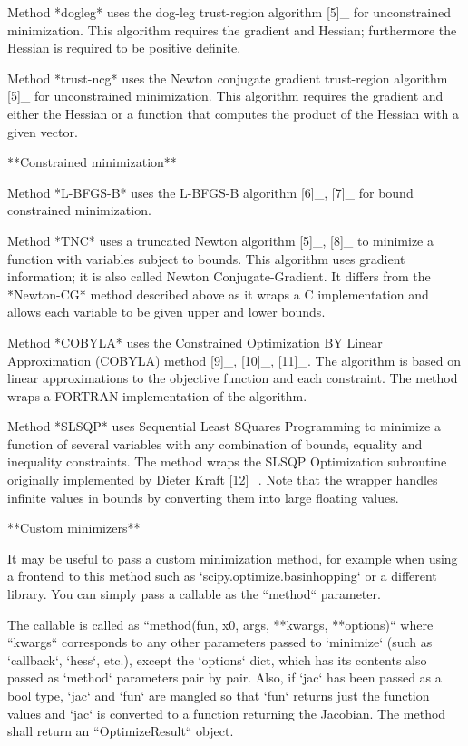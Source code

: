 \begin{DoxyVerb}
Method *dogleg* uses the dog-leg trust-region algorithm [5]_
for unconstrained minimization. This algorithm requires the gradient
and Hessian; furthermore the Hessian is required to be positive definite.

Method *trust-ncg* uses the Newton conjugate gradient trust-region
algorithm [5]_ for unconstrained minimization. This algorithm requires
the gradient and either the Hessian or a function that computes the
product of the Hessian with a given vector.

**Constrained minimization**

Method *L-BFGS-B* uses the L-BFGS-B algorithm [6]_, [7]_ for bound
constrained minimization.

Method *TNC* uses a truncated Newton algorithm [5]_, [8]_ to minimize a
function with variables subject to bounds. This algorithm uses
gradient information; it is also called Newton Conjugate-Gradient. It
differs from the *Newton-CG* method described above as it wraps a C
implementation and allows each variable to be given upper and lower
bounds.

Method *COBYLA* uses the Constrained Optimization BY Linear
Approximation (COBYLA) method [9]_, [10]_, [11]_. The algorithm is
based on linear approximations to the objective function and each
constraint. The method wraps a FORTRAN implementation of the algorithm.

Method *SLSQP* uses Sequential Least SQuares Programming to minimize a
function of several variables with any combination of bounds, equality
and inequality constraints. The method wraps the SLSQP Optimization
subroutine originally implemented by Dieter Kraft [12]_. Note that the
wrapper handles infinite values in bounds by converting them into large
floating values.

**Custom minimizers**

It may be useful to pass a custom minimization method, for example
when using a frontend to this method such as `scipy.optimize.basinhopping`
or a different library.  You can simply pass a callable as the ``method``
parameter.

The callable is called as ``method(fun, x0, args, **kwargs, **options)``
where ``kwargs`` corresponds to any other parameters passed to `minimize`
(such as `callback`, `hess`, etc.), except the `options` dict, which has
its contents also passed as `method` parameters pair by pair.  Also, if
`jac` has been passed as a bool type, `jac` and `fun` are mangled so that
`fun` returns just the function values and `jac` is converted to a function
returning the Jacobian.  The method shall return an ``OptimizeResult``
object.


\end{DoxyVerb}
